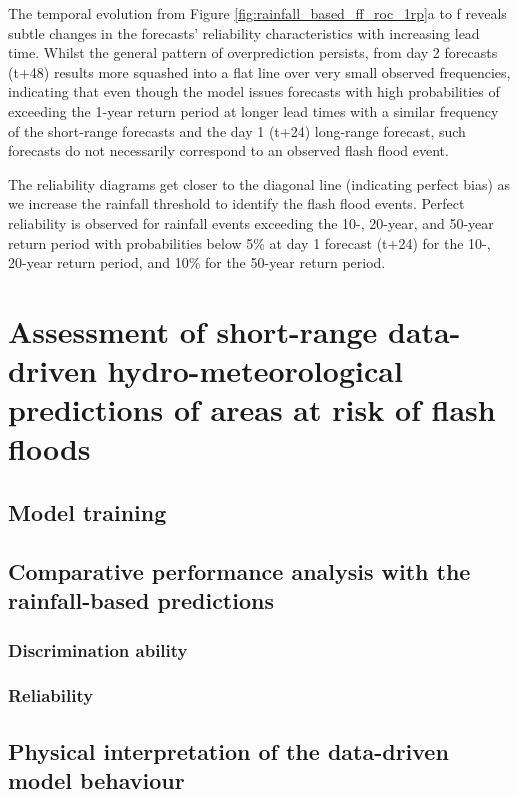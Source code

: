The temporal evolution from Figure \ref{fig:rainfall_based_ff_roc_1rp}a to f reveals subtle changes in the forecasts' reliability characteristics with increasing lead time. Whilst the general pattern of overprediction persists, from day 2 forecasts (t+48) results more squashed into a flat line over very small observed frequencies, indicating that even though the model issues forecasts with high probabilities of exceeding the 1-year return period at longer lead times with a similar frequency of the short-range forecasts and the day 1 (t+24) long-range forecast, such forecasts do not necessarily correspond to an observed flash flood event.

The reliability diagrams get closer to the diagonal line (indicating perfect bias) as we increase the rainfall threshold to identify the flash flood events. Perfect reliability is observed for rainfall events exceeding the 10-, 20-year, and 50-year return period with probabilities below 5\% at day 1 forecast (t+24) for the 10-, 20-year return period, and 10\% for the 50-year return period.



\section{Assessment of short-range data-driven hydro-meteorological predictions of areas at risk of flash floods}
\label{verif_data_driven_short_fc}

\subsection{Model training}

\subsection{Comparative performance analysis with the rainfall-based predictions}
\subsubsection{Discrimination ability}
\subsubsection{Reliability}

\subsection{Physical interpretation of the data-driven model behaviour}

